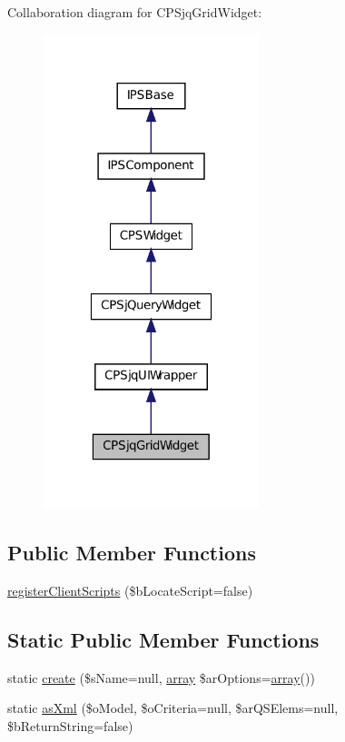Collaboration diagram for CPSjqGridWidget:\nopagebreak
\begin{figure}[H]
\begin{center}
\leavevmode
\includegraphics[width=178pt]{classCPSjqGridWidget__coll__graph}
\end{center}
\end{figure}
\subsection*{Public Member Functions}
\begin{DoxyCompactItemize}
\item 
\hyperlink{classCPSjqGridWidget_ac02a66bde8e72e4909137bf748edf665}{registerClientScripts} (\$bLocateScript=false)
\end{DoxyCompactItemize}
\subsection*{Static Public Member Functions}
\begin{DoxyCompactItemize}
\item 
static \hyperlink{classCPSjqGridWidget_a0ffc269a208148ade57c7eb608a4562a}{create} (\$sName=null, \hyperlink{list_8php_aa3205d038c7f8feb5c9f01ac4dfadc88}{array} \$arOptions=\hyperlink{list_8php_aa3205d038c7f8feb5c9f01ac4dfadc88}{array}())
\item 
static \hyperlink{classCPSjqGridWidget_a583388ee2bd227a35a8e7bd7d95badb2}{asXml} (\$oModel, \$oCriteria=null, \$arQSElems=null, \$bReturnString=false)
\end{DoxyCompactItemize}
